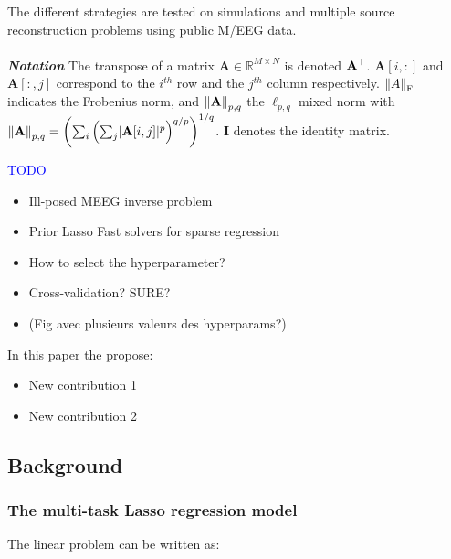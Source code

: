 The different strategies are tested on simulations and multiple source reconstruction 
problems using public M/EEG data.
\\
\\
\textit{\textbf{Notation}} The transpose of a matrix $\mathbf{A} \in \mathbb{R}^{M \times N}$ is
denoted $\bf{A}^\top$. $\mathbf{A}[i,:]$ and $\mathbf{A}[:,j]$ correspond to the $i^{th}$
row and the $j^{th}$ column respectively. $\left \lVert A \right \rVert_{\text{F}}$ indicates the Frobenius norm,
and $\left \lVert \mathbf{A} \right \rVert_{p,q}$ the $\ell_{p,q}$ mixed norm with $\left \lVert \mathbf{A} \right \rVert_{p,q} 
= \left(\sum_i \left(\sum_j \lvert \mathbf{A}[i,j] \rvert^p\right)^{q/p}\right)^{1/q}$.
$\mathbf{I}$ denotes the identity matrix.


\textcolor{blue}{TODO}
\begin{itemize}
    \item Ill-posed MEEG inverse problem
    \item Prior Lasso Fast solvers for sparse regression
    \item How to select the hyperparameter?
    \item Cross-validation? SURE?
    \item (Fig avec plusieurs valeurs des hyperparams?)
\end{itemize}
%
In this paper the propose:
\begin{itemize}
    \item New contribution 1
    \item New contribution 2
\end{itemize}

\subsection{Background}
\label{sub:background}
%

\subsubsection{The multi-task Lasso regression model}

The linear problem can be written as:


